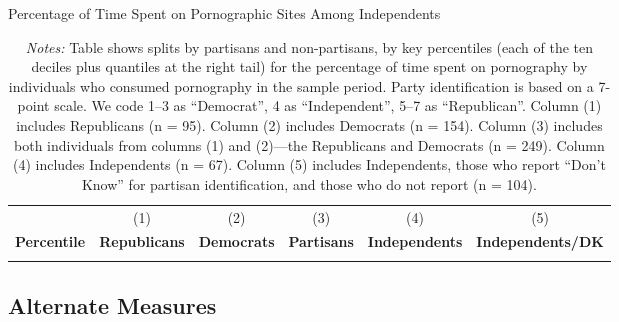\documentclass[12pt, letterpaper]{article}
\begin{document}
\begin{table}[ht] \centering \small \setlength\tabcolsep{6 pt}
	\caption{Percentage of Time Spent on Pornographic Sites Among Independents}
	\label{tab:percentiles_prop_duration_adultsites_by_individuals_independents_partisans}
	\begin{adjustbox}{max width=\textwidth}
		\begin{tabular}{@{\hspace{0\tabcolsep}}crrrrr@{\hspace{0\tabcolsep}}}
			\toprule		
			&\multicolumn{1}{c}{(1)}&\multicolumn{1}{c}{(2)}&\multicolumn{1}{c}{(3)}&\multicolumn{1}{c}{(4)}&\multicolumn{1}{c}{(5)}\\	
			\multicolumn{1}{l}{\textbf{Percentile}}&\multicolumn{1}{c}{\textbf{Republicans}}&\multicolumn{1}{c}{\textbf{Democrats}}&\multicolumn{1}{c}{\textbf{Partisans}}&\multicolumn{1}{c}{\textbf{Independents}}&\multicolumn{1}{r}{\textbf{Independents/DK}}\\
			\midrule
			\\
			\bottomrule
		\end{tabular}
	\end{adjustbox}
	\caption*{\footnotesize \emph{Notes:} 
		Table shows splits by partisans and non-partisans, by key percentiles (each of the ten deciles plus quantiles at the right tail) for the percentage of time spent on pornography by individuals who consumed pornography in the sample period. 
		Party identification is based on a 7-point scale. We code 1--3 as ``Democrat'', 4 as ``Independent'', 5--7 as ``Republican''.
		Column (1) includes Republicans (n = 95).
		Column (2) includes Democrats (n = 154).
		Column (3) includes both individuals from columns (1) and (2)---the Republicans and Democrats (n = 249).
		Column (4) includes Independents (n = 67).
		Column (5) includes Independents, those who report ``Don't Know'' for partisan identification, and those who do not report (n = 104).
	}
\end{table}

\cleardoublepage
\FloatBarrier
\subsection{Alternate Measures}
\end{document}
